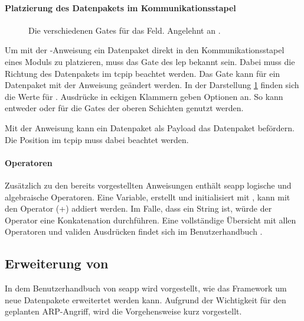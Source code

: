 \paragraph{Platzierung des Datenpakets im Kommunikationsstapel}
\begin{figure}[ht]
	\centering
	
	\caption[SEA-Gates]{Die verschiedenen Gates für das  Feld. Angelehnt an \cite[Abbildung 5.1]{SEAManual}.}
	\label{fig:seaGates}
\end{figure}

Um mit der -Anweisung ein Datenpaket direkt in den Kommunikationsstapel eines Moduls zu platzieren, muss das Gate des \gls{lep} bekannt sein. Dabei muss die Richtung des Datenpakets im \gls{tcpip} beachtet werden. Das Gate kann für ein Datenpaket mit der Anweisung  geändert werden. In der Darstellung \ref{fig:seaGates} finden sich die Werte für . Ausdrücke in eckigen Klammern geben Optionen an. So kann entweder  oder  für die Gates der oberen Schichten genutzt werden.

Mit der Anweisung  kann ein Datenpaket  als Payload das Datenpaket  befördern. Die Position im \gls{tcpip} muss dabei beachtet werden. 

\paragraph{Operatoren}
Zusätzlich zu den bereits vorgestellten Anweisungen enthält \gls{seapp} logische und algebraische Operatoren. Eine Variable, erstellt und initialisiert mit , kann \ua mit den Operator (+) addiert werden. Im Falle, dass  ein String ist, würde der Operator eine Konkatenation durchführen. Eine vollständige Übersicht mit allen Operatoren und validen Ausdrücken findet sich im Benutzerhandbuch \autocite[]{SEAManual}.

\subsection{Erweiterung von } \label{sec:erweiterungSea}
In dem Benutzerhandbuch \cite[]{SEAManual} von \gls{seapp} wird vorgestellt, wie das Framework um neue Datenpakete erweitertet werden kann. Aufgrund der Wichtigkeit für den geplanten ARP-Angriff, wird die Vorgehensweise kurz vorgestellt.

